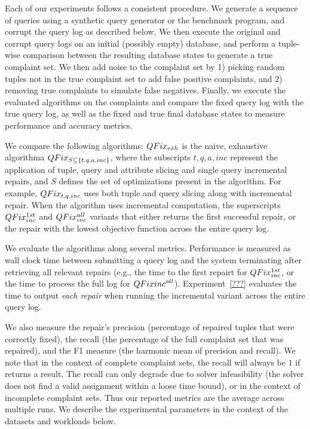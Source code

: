 Each of our experiments follows a consistent procedure. 
We generate a sequence of queries using a synthetic query generator or 
the benchmark program, and corrupt the query log as described below. 
We then execute the original and corrupt query logs on an initial (possibly empty) database,
and perform a tuple-wise comparison between the resulting database states 
to generate a true complaint set.  
We then add noise to the complaint set by 1) picking random tuples not in the true
complaint set to add false positive complaints, and 2) removing true complaints to simulate false negatives.
Finally, we execute the evaluated algorithms on the complaints and compare the fixed
query log with the true query log, as well as the fixed and true
final database states to measure performance and accuracy metrics.

We compare the following algorithms:
$QFix_{exh}$ is the naive, exhaustive algorithma 
$QFix_{S \subseteq \{t,q,a,inc\}}$, where the subscripts $t,q,a,inc$ represent the
application of tuple, query and attribute slicing and single query incremental repairs, 
and $S$ defines the set of optimizations present in the algorithm.
For example, $QFix_{t,q,inc}$ uses both tuple and query slicing along with incremental repair.
When the algorithm uses incremental computation, the superscripts $QFix_{inc}^{1st}$
and $QFix_{inc}^{all}$ variants that either returns the first successful repair,
or the repair with the lowest objective function across the entire query log.

We evaluate the algorithms along several metrics.  Performance is measured as wall clock
time between submitting a query log and the system terminating after retrieving all relevant repairs 
(e.g., the time to the first repairt for $QFix_{inc}^{1st}$, or the time to process the full log for $QFix{inc}^{all}$).  
Experiment~\ref{???} evaluates the time to output {\it each repair} when running the 
incremental variant across the entire query log.  

We also measure the repair's precision (percentage of repaired tuples that were correctly fixed), 
the recall (the percentage of the full complaint set that was repaired), 
and the F1 measure (the harmonic mean of precision and recall).
We note that in the context of complete complaint sets, the recall will always be $1$ if \sys returns a result.
The recall can only degrade due to solver infeasibility (the solver does not find a valid assignment within a loose time bound), 
or in the context of incomplete complaint sets.   Thus our reported metrics are the average across multiple runs.
We describe the experimental parameters in the context of the datasets and workloads below.



